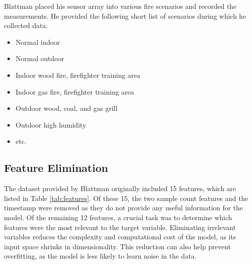 \documentclass[conference]{IEEEtran}
\begin{document}
Blattman placed his sensor array into various fire scenarios and recorded the measurements. He provided the following short list of scenarios during which he collected data:
\begin{itemize}
    \item Normal indoor
    \item Normal outdoor
    \item Indoor wood fire, firefighter training area
    \item Indoor gas fire, firefighter training area
    \item Outdoor wood, coal, and gas grill
    \item Outdoor high humidity
    \item etc.
\end{itemize}
\cite{Blattmann}

\subsection{Feature Elimination}
The dataset provided by Blattman originally included 15 features, which are listed in Table \ref{tab:features}. Of these 15, the two sample count features and the timestamp were removed as they do not provide any useful information for the model. Of the remaining 12 features, a crucial task was to determine which features were the most relevant to the target variable. Eliminating irrelevant variables reduces the complexity and computational cost of the model, as its input space shrinks in dimensionality. This reduction can also help prevent overfitting, as the model is less likely to learn noise in the data.
\end{document}
